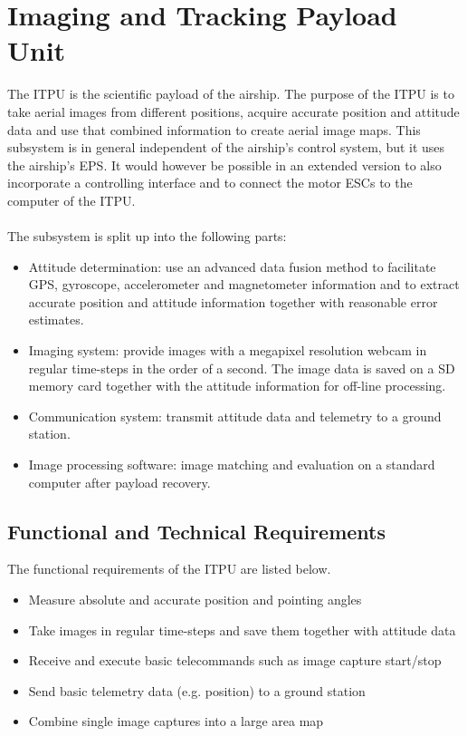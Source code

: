 \chapter{Imaging and Tracking Payload Unit}
\label{chap:itpu}

The \ac{ITPU} is the scientific payload of the airship. The purpose of the \ac{ITPU} is to take aerial images from different positions, acquire accurate position and attitude data and use that combined information to create aerial image maps. This subsystem is in general independent of the airship's control system, but it uses the airship's \ac{EPS}. It would however be possible in an extended version to also incorporate a controlling interface and to connect the motor \ac{ESC}s to the computer of the \ac{ITPU}. 
\\
\\
 The subsystem is split up into the following parts:
\begin{itemize}
\item Attitude determination: use an advanced data fusion method to facilitate \ac{GPS}, gyroscope, accelerometer and magnetometer information and to extract accurate position and attitude information together with reasonable error estimates.
\item Imaging system: provide images with a megapixel resolution webcam in regular time-steps in the order of a second. The image data is saved on a \ac{SD} memory card together with the attitude information for off-line processing.
\item Communication system: transmit attitude data and telemetry to a ground station.
\item Image processing software: image matching and evaluation on a standard computer after payload
recovery.
\end{itemize}

\pagebreak

\section{Functional and Technical Requirements}

The functional requirements of the \ac{ITPU} are listed below.

\begin{itemize}
\item Measure absolute and accurate position and pointing angles
\item Take images in regular time-steps and save them together with attitude data
\item Receive and execute basic telecommands such as image capture start/stop
\item Send basic telemetry data (e.g. position) to a ground station
\item Combine single image captures into a large area map
\end{itemize}

